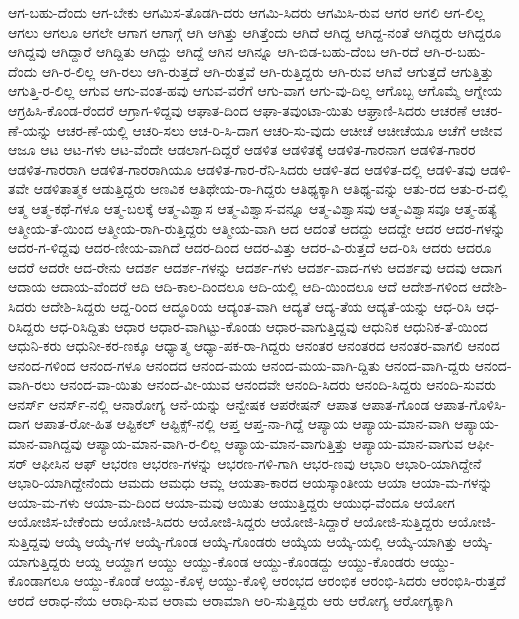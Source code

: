 {ಆಗ-ಬಹು-ದೆಂದು
ಆಗ-ಬೇಕು
ಆಗಮಿಸ-ತೊಡಗಿ-ದರು
ಆಗಮಿ-ಸಿದರು
ಆಗಮಿಸಿ-ರುವ
ಆಗರ
ಆಗಲಿ
ಆಗ-ಲಿಲ್ಲ
ಆಗಲು
ಆಗಲೂ
ಆಗಲೇ
ಆಗಾಗ
ಆಗಾಗ್ಗೆ
ಆಗಿ
ಆಗಿತ್ತು
ಆಗಿತ್ತೆಂದು
ಆಗಿದೆ
ಆಗಿದ್ದ
ಆಗಿದ್ದ-ನಂತೆ
ಆಗಿದ್ದರು
ಆಗಿದ್ದರೂ
ಆಗಿದ್ದವು
ಆಗಿದ್ದಾರೆ
ಆಗಿದ್ದಿತು
ಆಗಿದ್ದು
ಆಗಿದ್ದೆ
ಆಗಿನ
ಆಗಿನ್ನೂ
ಆಗಿ-ಬಿಡ-ಬಹು-ದೆಂಬ
ಆಗಿ-ರದೆ
ಆಗಿ-ರ-ಬಹು-ದೆಂದು
ಆಗಿ-ರ-ಲಿಲ್ಲ
ಆಗಿ-ರಲು
ಆಗಿ-ರುತ್ತದೆ
ಆಗಿ-ರುತ್ತವೆ
ಆಗಿ-ರುತ್ತಿದ್ದರು
ಆಗಿ-ರುವ
ಆಗಿವೆ
ಆಗುತ್ತದೆ
ಆಗುತ್ತಿತ್ತು
ಆಗುತ್ತಿ-ರ-ಲಿಲ್ಲ
ಆಗುವ
ಆಗು-ವಂತ-ಹವು
ಆಗುವ-ವರೆಗೆ
ಆಗು-ವಾಗ
ಆಗು-ವು-ದಿಲ್ಲ
ಆಗೊಬ್ಬ
ಆಗೊಮ್ಮೆ
ಆಗ್ನೇಯ
ಆಗ್ರಹಿಸಿ-ಕೊಂಡ-ರೆಂದರೆ
ಆಗ್ರಾಗ-ಳಿದ್ದವು
ಆಘಾತ-ದಿಂದ
ಆಘಾ-ತವುಂಟಾ-ಯಿತು
ಆಘ್ರಾಣಿ-ಸಿದರು
ಆಚರಣೆ
ಆಚರ-ಣೆ-ಯನ್ನು
ಆಚರ-ಣೆ-ಯಲ್ಲಿ
ಆಚರಿ-ಸಲು
ಆಚ-ರಿ-ಸಿ-ದಾಗ
ಆಚರಿ-ಸು-ವುದು
ಆಚೀಚೆ
ಆಚೀಚೆಯೂ
ಆಚೆಗೆ
ಆಜೀವ
ಆಜೂ
ಆಟ
ಆಟ-ಗಳು
ಆಟ-ವೆಂದೇ
ಆಡಲಾಗ-ದಿದ್ದರೆ
ಆಡಳಿತ
ಆಡಳಿತಕ್ಕೆ
ಆಡಳಿತ-ಗಾರನಾಗ
ಆಡಳಿತ-ಗಾರರ
ಆಡಳಿತ-ಗಾರರಾಗಿ
ಆಡಳಿತ-ಗಾರರಾಗಿಯೂ
ಆಡಳಿತ-ಗಾರ-ರೆನಿ-ಸಿದರು
ಆಡಳಿ-ತದ
ಆಡಳಿತ-ದಲ್ಲಿ
ಆಡಳಿ-ತವು
ಆಡಳಿ-ತವೇ
ಆಡಳಿತಾತ್ಮಕ
ಆಡುತ್ತಿದ್ದರು
ಆಣವಿಕ
ಆತಿಥೇಯ-ರಾ-ಗಿದ್ದರು
ಆತಿಥ್ಯಕ್ಕಾಗಿ
ಆತಿಥ್ಯ-ವನ್ನು
ಆತು-ರದ
ಆತು-ರ-ದಲ್ಲಿ
ಆತ್ಮ
ಆತ್ಮ-ಕಥೆ-ಗಳೂ
ಆತ್ಮ-ಬಲಕ್ಕೆ
ಆತ್ಮ-ವಿಶ್ವಾಸ
ಆತ್ಮ-ವಿಶ್ವಾಸ-ವನ್ನೂ
ಆತ್ಮ-ವಿಶ್ವಾಸವು
ಆತ್ಮ-ವಿಶ್ವಾಸವೂ
ಆತ್ಮ-ಹತ್ಯೆ
ಆತ್ಮೀಯ-ತೆ-ಯಿಂದ
ಆತ್ಮೀಯ-ರಾಗಿ-ರುತ್ತಿದ್ದರು
ಆತ್ಮೀಯ-ವಾಗಿ
ಆದ
ಆದಂತೆ
ಆದದ್ದು
ಆದದ್ದೇ
ಆದರ
ಆದರ-ಗಳನ್ನು
ಆದರ-ಗ-ಳಿದ್ದವು
ಆದರ-ಣೀಯ-ವಾಗಿದೆ
ಆದರ-ದಿಂದ
ಆದರ-ವಿತ್ತು
ಆದರ-ವಿ-ರುತ್ತದೆ
ಆದ-ರಿಸಿ
ಆದರು
ಆದರೂ
ಆದರೆ
ಆದರೇ
ಆದ-ರೇನು
ಆದರ್ಶ
ಆದರ್ಶ-ಗಳನ್ನು
ಆದರ್ಶ-ಗಳು
ಆದರ್ಶ-ವಾದ-ಗಳು
ಆದರ್ಶವು
ಆದವು
ಆದಾಗ
ಆದಾಯ
ಆದಾಯ-ವೆಂದರೆ
ಆದಿ
ಆದಿ-ಕಾಲ-ದಿಂದಲೂ
ಆದಿ-ಯಲ್ಲಿ
ಆದಿ-ಯಿಂದಲೂ
ಆದೆ
ಆದೇಶ-ಗಳಿಂದ
ಆದೇಶಿ-ಸಿದರು
ಆದೇಶಿ-ಸಿದ್ದರು
ಆದ್ದ-ರಿಂದ
ಆದ್ಧೂರಿಯ
ಆದ್ಯಂತ-ವಾಗಿ
ಆದ್ಯತೆ
ಆದ್ಯ-ತೆಯ
ಆದ್ಯತೆ-ಯನ್ನು
ಆಧ-ರಿಸಿ
ಆಧ-ರಿಸಿದ್ದರು
ಆಧ-ರಿಸಿದ್ದಿತು
ಆಧಾರ
ಆಧಾರ-ವಾಗಿಟ್ಟು-ಕೊಂಡು
ಆಧಾರ-ವಾಗುತ್ತಿದ್ದವು
ಆಧುನಿಕ
ಆಧುನಿಕ-ತೆ-ಯಿಂದ
ಆಧುನಿ-ಕರು
ಆಧುನೀ-ಕರ-ಣಕ್ಕೂ
ಆಧ್ಯಾತ್ಮ
ಆಧ್ಯಾ-ಪಕ-ರಾ-ಗಿದ್ದರು
ಆನಂತರ
ಆನಂತರದ
ಆನಂತರ-ವಾಗಲಿ
ಆನಂದ
ಆನಂದ-ಗಳಿಂದ
ಆನಂದ-ಗಳೂ
ಆನಂದದ
ಆನಂದ-ಮಯ
ಆನಂದ-ಮಯ-ವಾಗಿ-ದ್ದಿತು
ಆನಂದ-ವಾಗಿ-ದ್ದರು
ಆನಂದ-ವಾಗಿ-ರಲು
ಆನಂದ-ವಾ-ಯಿತು
ಆನಂದ-ವೀ-ಯುವ
ಆನಂದವೇ
ಆನಂದಿ-ಸಿದರು
ಆನಂದಿ-ಸಿದ್ದರು
ಆನಂದಿ-ಸುವರು
ಆನರ್ಸ್
ಆನರ್ಸ್-ನಲ್ಲಿ
ಆನಾರೋಗ್ಯ
ಆನೆ-ಯನ್ನು
ಆನ್ವೇಷಕ
ಆಪರೇಷನ್
ಆಪಾತ
ಆಪಾತ-ಗೊಂಡ
ಆಪಾತ-ಗೊಳಿಸಿ-ದಾಗ
ಆಪಾತ-ರೋ-ಹಿತ
ಆಪ್ಟಿಕಲ್
ಆಪ್ಟಿಕ್ಸ್-ನಲ್ಲಿ
ಆಪ್ತ
ಆಪ್ತ-ನಾ-ಗಿದ್ದೆ
ಆಪ್ಯಾಯ
ಆಪ್ಯಾಯ-ಮಾನ-ವಾಗಿ
ಆಪ್ಯಾಯ-ಮಾನ-ವಾಗಿದ್ದವು
ಆಪ್ಯಾಯ-ಮಾನ-ವಾಗಿ-ರ-ಲಿಲ್ಲ
ಆಪ್ಯಾಯ-ಮಾನ-ವಾಗುತ್ತಿತ್ತು
ಆಪ್ಯಾಯ-ಮಾನ-ವಾಗುವ
ಆಫೀ-ಸರ್
ಆಫೀಸಿನ
ಆಫ್
ಆಭರಣ
ಆಭರಣ-ಗಳನ್ನು
ಆಭರಣ-ಗಳಿ-ಗಾಗಿ
ಆಭರ-ಣವು
ಆಭಾರಿ
ಆಭಾರಿ-ಯಾಗಿದ್ದೇನೆ
ಆಭಾರಿ-ಯಾಗಿದ್ದೇನೆಂದು
ಆಮದು
ಆಮಧು
ಆಮ್ಲ
ಆಯತಾ-ಕಾರದ
ಆಯಸ್ಕಾಂತೀಯ
ಆಯಾ
ಆಯಾ-ಮ-ಗಳನ್ನು
ಆಯಾ-ಮ-ಗಳು
ಆಯಾ-ಮ-ದಿಂದ
ಆಯಾ-ಮವು
ಆಯಿತು
ಆಯುತ್ತಿದ್ದರು
ಆಯುಧ-ವೆಂದೂ
ಆಯೋಗ
ಆಯೋಜಿಸ-ಬೇಕೆಂದು
ಆಯೋಜಿ-ಸಿದರು
ಆಯೋಜಿ-ಸಿದ್ದರು
ಆಯೋಜಿ-ಸಿದ್ದಾರೆ
ಆಯೋಜಿ-ಸುತ್ತಿದ್ದರು
ಆಯೋಜಿ-ಸುತ್ತಿದ್ದವು
ಆಯ್ಕೆ
ಆಯ್ಕೆ-ಗಳ
ಆಯ್ಕೆ-ಗೊಂಡ
ಆಯ್ಕೆ-ಗೊಂಡರು
ಆಯ್ಕೆಯ
ಆಯ್ಕೆ-ಯಲ್ಲಿ
ಆಯ್ಕೆ-ಯಾಗಿತ್ತು
ಆಯ್ಕೆ-ಯಾಗುತ್ತಿದ್ದರು
ಆಯ್ದ
ಆಯ್ದಾಗ
ಆಯ್ದು
ಆಯ್ದು-ಕೊಂಡ
ಆಯ್ದು-ಕೊಂಡದ್ದು
ಆಯ್ದು-ಕೊಂಡರು
ಆಯ್ದು-ಕೊಂಡಾಗಲೂ
ಆಯ್ದು-ಕೊಂಡೆ
ಆಯ್ದು-ಕೊಳ್ಳ
ಆಯ್ದು-ಕೊಳ್ಳಿ
ಆರಂಭದ
ಆರಂಭಿಕ
ಆರಂಭಿ-ಸಿದರು
ಆರಂಭಿಸಿ-ರುತ್ತದೆ
ಆರದೆ
ಆರಾಧ-ನೆಯ
ಆರಾಧಿ-ಸುವ
ಆರಾಮ
ಆರಾಮಾಗಿ
ಆರಿ-ಸುತ್ತಿದ್ದರು
ಆರು
ಆರೋಗ್ಯ
ಆರೋಗ್ಯಕ್ಕಾಗಿ
}
